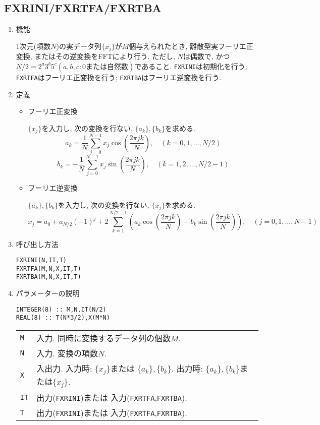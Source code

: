 \documentclass[a4j]{jsarticle}
\begin{document}
\subsection{FXRINI/FXRTFA/FXRTBA}
\begin{enumerate}
\item 機能
  
    1次元(項数$N$)の実データ列$\{x_j\}$が$M$個与えられたとき,
    離散型実フーリエ正変換, またはその逆変換をFFTにより行う. 
    ただし, 
    $N$は偶数で, かつ$N/2=2^a3^b5^c(a,b,c: 0または自然数)$であること.    
     \texttt{FXRINI}は初期化を行う;
     \texttt{FXRTFA}はフーリエ正変換を行う;
     \texttt{FXRTBA}はフーリエ逆変換を行う.

  \item 定義
    \begin{itemize}
    \item フーリエ正変換
      
       $\{x_j\}$を入力し, 次の変換を行ない, $\{a_k\},\{b_k\}$を求める. 
       \[a_k= \frac1N\sum^{N-1}_{j=0}x_j\cos\left(\frac{2\pi jk}N\right),
       \quad (k=0,1,\ldots,N/2)\]
       \[b_k=-\frac1N\sum^{N-1}_{j=0}x_j\sin\left(\frac{2\pi jk}N\right),
       \quad (k=1,2,\ldots,N/2-1)\]

     \item フーリエ逆変換

       $\{a_k\},\{b_k\}$を入力し, 次の変換を行ない, $\{x_j\}$を求める. 
       \[
       x_j=a_0+a_{N/2}(-1)^j+2\sum^{N/2-1}_{k=1}
       \left(a_k\cos\left(\frac{2\pi jk}N\right)
                          -b_k\sin\left(\frac{2\pi jk}N\right)\right),
       \quad (j=0,1,\ldots,N-1)\]
     \end{itemize}    
  \item 呼び出し方法 

    \texttt{FXRINI(N,IT,T)}\\
    \texttt{FXRTFA(M,N,X,IT,T)}\\
    \texttt{FXRTBA(M,N,X,IT,T)}

\item パラメーターの説明

  \vspace{-2ex}

     \begin{verbatim}
INTEGER(8) :: M,N,IT(N/2)
REAL(8) :: T(N*3/2),X(M*N)
\end{verbatim}

  \vspace{-1ex}     
     
    \begin{tabular}{ll}
      \texttt{M}  & 入力. 同時に変換するデータ列の個数$M$.\\
      \texttt{N}  & 入力. 変換の項数$N$.\\
      \texttt{X}   & 入出力. 入力時: $\{x_j\}$または
      $\{a_k\},\{b_k\}$. 出力時: $\{a_k\},\{b_k\}$または$\{x_j\}$.\\
      \texttt{IT}   &  出力(\texttt{FXRINI})または
                        入力(\texttt{FXRTFA},\texttt{FXRTBA}).\\
      \texttt{T}   & 出力(\texttt{FXRINI})または
入力(\texttt{FXRTFA},\texttt{FXRTBA}).\\
    \end{tabular}


\end{enumerate}
\end{document}
